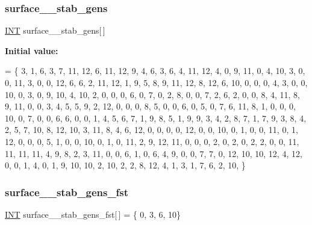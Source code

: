 \subsubsection{\texorpdfstring{surface\+\_\+\_\+stab\+\_\+gens}{surface\_13\_stab\_gens}}
{\footnotesize\ttfamily \mbox{\hyperlink{galois_8h_a09fddde158a3a20bd2dcadb609de11dc}{I\+NT}} surface\+\_\+\_\+stab\+\_\+gens\mbox{[}$\,$\mbox{]}}

{\bfseries Initial value\+:}
\begin{DoxyCode}
= \{
     3,  1,  6,  3,  7, 11, 12,  6, 11, 12,  9,  4,  6,  3,  6,  4, 
    11, 12,  4,  0,  9, 11,  0,  4, 10,  3,  0,  0, 11,  3,  0,  0, 
    12,  6,  6,  2, 11, 12,  1,  9,  5,  8,  9, 11, 12,  8, 12,  6, 
    10,  0,  0,  0,  4,  3,  0,  0, 10,  0,  3,  0,  9, 10,  4, 10, 
     2,  0,  0,  0,  6,  0,  7,  0,  2,  8,  0,  0,  7,  2,  6,  2, 
     0,  0,  8,  4, 11,  8,  9, 11,  0,  0,  3,  4,  5,  5,  9,  2, 
    12,  0,  0,  0,  8,  5,  0,  0,  6,  0,  5,  0,  7,  6, 11,  8, 
     1,  0,  0,  0, 10,  0,  7,  0,  0,  6,  6,  0,  0,  1,  4,  5, 
     6,  7,  1,  9,  8,  5,  1,  9,  9,  3,  4,  2,  8,  7,  1,  7, 
     9,  3,  8,  4,  2,  5,  7, 10,  8, 12, 10,  3, 11,  8,  4,  6, 
    12,  0,  0,  0,  0, 12,  0,  0, 10,  0,  1,  0,  0, 11,  0,  1, 
    12,  0,  0,  0,  5,  1,  0,  0, 10,  0,  1,  0, 11,  2,  9, 12, 
    11,  0,  0,  0,  2,  0,  2,  0,  2,  2,  0,  0, 11, 11, 11, 11, 
     4,  9,  8,  2,  3, 11,  0,  0,  6,  1,  0,  6,  4,  9,  0,  0, 
     7,  7,  0, 12, 10, 10, 12,  4, 12,  0,  0,  1,  4,  0,  1,  9, 
    10, 10,  2, 10,  2,  2,  8, 12,  4,  1,  3,  1,  7,  6,  2, 10, 
\}
\end{DoxyCode}
\mbox{\label{surface__13_8_c_ab85ba6652615fb0c8accaff8956ee8b7}} 
\subsubsection{\texorpdfstring{surface\+\_\+\_\+stab\+\_\+gens\+\_\+fst}{surface\_13\_stab\_gens\_fst}}
{\footnotesize\ttfamily \mbox{\hyperlink{galois_8h_a09fddde158a3a20bd2dcadb609de11dc}{I\+NT}} surface\+\_\+\_\+stab\+\_\+gens\+\_\+fst\mbox{[}$\,$\mbox{]} = \{ 0, 3, 6, 10\}}

